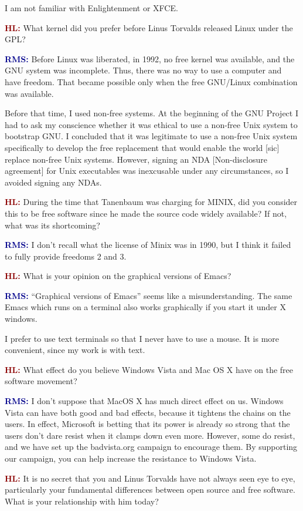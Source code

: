 \documentclass{article}
\newcommand{\hl}{\textcolor{DarkRed}{\textbf{HL: }}}
\newcommand{\rms}{\textcolor{DarkBlue}{\textbf{RMS: }}}
\begin{document}
I am not familiar with Enlightenment or XFCE.

\hl What kernel did you prefer before Linus Torvalds released Linux under the GPL?

\rms Before Linux was liberated, in 1992, no free kernel was available, and the GNU system was incomplete. Thus, there was no way to use a computer and have freedom. That became possible only when the free GNU/Linux combination was available.

Before that time, I used non-free systems. At the beginning of the GNU Project I had to ask my conscience whether it was ethical to use a non-free Unix system to bootstrap GNU. I concluded that it was legitimate to use a non-free Unix system specifically to develop the free replacement that would enable the world [sic] replace non-free Unix systems. However, signing an NDA [Non-disclosure agreement] for Unix executables was inexcusable under any circumstances, so I avoided signing any NDAs.

\hl During the time that Tanenbaum was charging for MINIX, did you consider this to be free software since he made the source code widely available? If not, what was its shortcoming?

\rms I don't recall what the license of Minix was in 1990, but I think it failed to fully provide freedoms 2 and 3.

\hl What is your opinion on the graphical versions of Emacs?

\rms ``Graphical versions of Emacs'' seems like a misunderstanding. The same Emacs which runs on a terminal also works graphically if you start it under X windows.

I prefer to use text terminals so that I never have to use a mouse. It is more convenient, since my work is with text.

\hl What effect do you believe Windows Vista and Mac OS X have on the free software movement?

\rms I don't suppose that MacOS X has much direct effect on us. Windows Vista can have both good and bad effects, because it tightens the chains on the users. In effect, Microsoft is betting that its power is already so strong that the users don't dare resist when it clamps down even more. However, some do resist, and we have set up the badvista.org campaign to encourage them. By supporting our campaign, you can help increase the resistance to Windows Vista.

\hl It is no secret that you and Linus Torvalds have not always seen eye to eye, particularly your fundamental differences between open source and free software. What is your relationship with him today?
\end{document}
